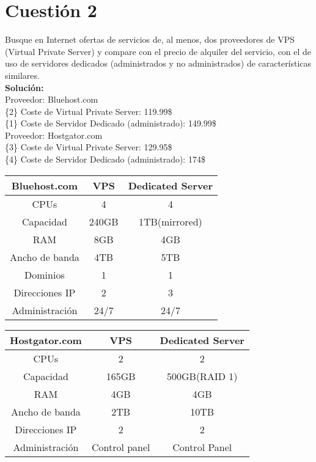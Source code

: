 \documentclass[a4paper, 11pt]{article} %
\begin{document}
\section{Cuestión 2}
Busque en Internet ofertas de servicios de, al menos, dos proveedores de VPS (Virtual Private Server) y compare con el precio de alquiler del servicio, con el de uso de servidores dedicados (administrados y no administrados) de características similares.\\
\textbf{Solución:}\\
Proveedor: Bluehost.com\\
\{2\} Coste de Virtual Private Server: 119.99\$\\
\{1\} Coste de Servidor Dedicado (administrado): 149.99\$\\
Proveedor: Hostgator.com\\
\{3\} Coste de Virtual Private Server: 129.95\$\\
\{4\} Coste de Servidor Dedicado (administrado): 174\$\\
\begin{table}[h]
	\begin{tabular}{|c|c|c|}
	\hline 
	Bluehost.com & VPS & Dedicated Server \\ 
	\hline 
	CPUs & 4 & 4 \\ 
	\hline 
	Capacidad& 240GB & 1TB(mirrored) \\ 
	\hline 
	RAM & 8GB & 4GB \\ 
	\hline 
	Ancho de banda & 4TB & 5TB \\ 
	\hline 
	Dominios & 1 & 1 \\ 
	\hline 
	Direcciones IP & 2 & 3 \\ 
	\hline 
	Administración & 24/7 & 24/7 \\ 
	\hline 
	\end{tabular}
\end{table} 
\begin{table}[h]
	\begin{tabular}{|c|c|c|}
	\hline 
	Hostgator.com & VPS & Dedicated Server \\ 
	\hline 
	CPUs & 2 & 2 \\ 
	\hline 
	Capacidad& 165GB & 500GB(RAID 1) \\ 
	\hline 
	RAM & 4GB & 4GB \\ 
	\hline 
	Ancho de banda & 2TB & 10TB \\ 
	\hline 
	Direcciones IP & 2 & 2 \\ 
	\hline 
	Administración & Control panel & Control Panel \\ 
	\hline 
	\end{tabular}
\end{table} 
\end{document}
